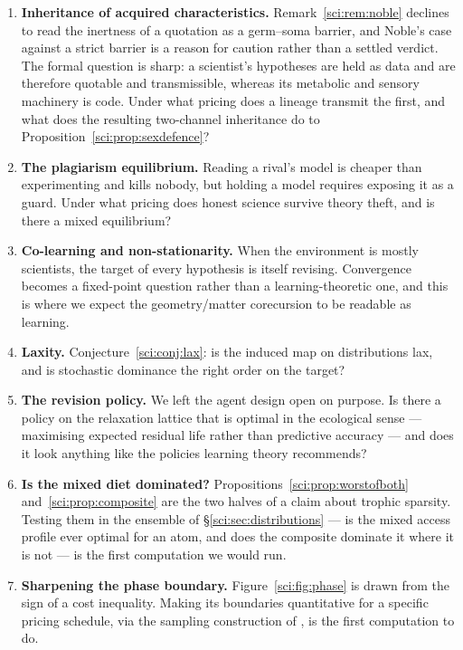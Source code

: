 \begin{enumerate}
\item \label{sci:op:noble} \textbf{Inheritance of acquired characteristics.} Remark~\ref{sci:rem:noble}
declines to read the inertness of a quotation as a germ--soma barrier, and Noble's case against a
strict barrier \cite{Noble} is a reason for caution rather than a settled verdict. The formal question
is sharp: a scientist's hypotheses are held as data and are therefore quotable and transmissible,
whereas its metabolic and sensory machinery is code. Under what pricing does a lineage transmit the
first, and what does the resulting two-channel inheritance do to
Proposition~\ref{sci:prop:sexdefence}?

\item \textbf{The plagiarism equilibrium.} Reading a rival's model is cheaper than experimenting and
kills nobody, but holding a model requires exposing it as a guard. Under what pricing does honest
science survive theory theft, and is there a mixed equilibrium?

\item \textbf{Co-learning and non-stationarity.} When the environment is mostly scientists, the target
of every hypothesis is itself revising. Convergence becomes a fixed-point question rather than a
learning-theoretic one, and this is where we expect the geometry/matter corecursion to be readable as
learning.

\item \textbf{Laxity.} Conjecture~\ref{sci:conj:lax}: is the induced map on distributions lax, and is
stochastic dominance the right order on the target?

\item \textbf{The revision policy.} We left the agent design open on purpose. Is there a policy on the
relaxation lattice that is optimal in the ecological sense --- maximising expected residual life
rather than predictive accuracy --- and does it look anything like the policies learning theory
recommends?

\item \textbf{Is the mixed diet dominated?} Propositions~\ref{sci:prop:worstofboth}
and~\ref{sci:prop:composite} are the two halves of a claim about trophic sparsity. Testing them in the
ensemble of \S\ref{sci:sec:distributions} --- is the mixed access profile ever optimal for an atom, and
does the composite dominate it where it is not --- is the first computation we would run.

\item \textbf{Sharpening the phase boundary.} Figure~\ref{sci:fig:phase} is drawn from the sign of a cost
inequality. Making its boundaries quantitative for a specific pricing schedule, via the sampling
construction of \cite{StochSim}, is the first computation to do.
\end{enumerate}



